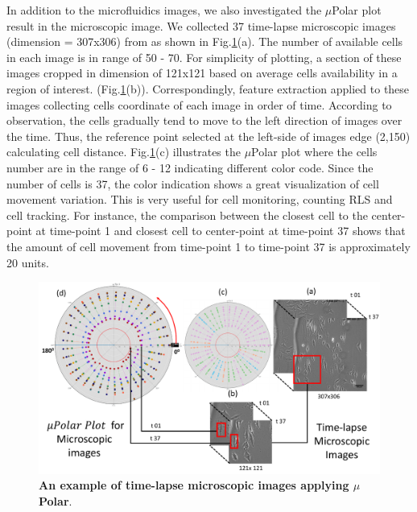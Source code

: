 \documentclass[conference]{IEEEtran}
\begin{document}
In addition to the microfluidics images, we also investigated the $\mu$Polar plot result in the microscopic image. We collected 37 time-lapse microscopic images (dimension = 307x306) from \cite{ref05} as shown in Fig.\ref{fig:scopic}(a). The number of available cells in each image is in range of 50 - 70. For simplicity of plotting, a section of these images cropped in dimension of 121x121 based on average cells availability in a region of interest. (Fig.\ref{fig:scopic}(b)). Correspondingly, feature extraction applied to these images collecting cells coordinate of each image in order of time. According to observation, the cells gradually tend to move to the left direction of images over the time. Thus, the reference point selected at the left-side of images edge (2,150) calculating cell distance. Fig.\ref{fig:scopic}(c) illustrates the $\mu$Polar plot where the cells number are in the range of 6 - 12 indicating different color code. Since the number of cells is 37, the color indication shows a great visualization of cell movement variation. This is very useful for cell monitoring, counting RLS and cell tracking. For instance, the comparison between the closest cell to the center-point at time-point 1 and closest cell to center-point at time-point 37 shows that the amount of cell movement from time-point 1 to time-point 37 is approximately 20 units.        


\begin{figure}
\centering
\includegraphics[width=\textwidth,height=10 cm]{Patterns/microscopic.pdf}
\caption{ \textbf{ An example of time-lapse microscopic images applying  $\mu$Polar}.}
\label{fig:scopic}
\end{figure}
\end{document}
